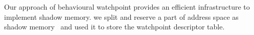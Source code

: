 

Our approach of behavioural watchpoint provides an efficient infrastructure to implement shadow memory. we split and reserve a part of address space as shadow memory~\cite{Cheng:2006:TEF:1157733.1157903} and used it to store the watchpoint descriptor table.%




